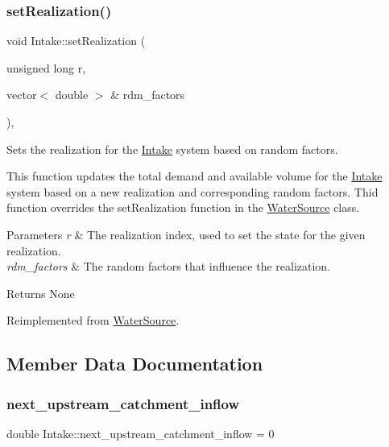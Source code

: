 \subsubsection{\texorpdfstring{set\+Realization()}{setRealization()}}
{\footnotesize\ttfamily void Intake\+::set\+Realization (\begin{DoxyParamCaption}\item[{unsigned long}]{r,  }\item[{vector$<$ double $>$ \&}]{rdm\+\_\+factors }\end{DoxyParamCaption})\hspace{0.3cm}{\ttfamily [override]}, {\ttfamily [virtual]}}



Sets the realization for the \mbox{\hyperlink{classIntake}{Intake}} system based on random factors. 

This function updates the total demand and available volume for the \mbox{\hyperlink{classIntake}{Intake}} system based on a new realization and corresponding random factors. Thid function overrides the set\+Realization function in the \mbox{\hyperlink{classWaterSource}{Water\+Source}} class.


\begin{DoxyParams}{Parameters}
{\em r} & The realization index, used to set the state for the given realization. \\
\hline
{\em rdm\+\_\+factors} & The random factors that influence the realization.\\
\hline
\end{DoxyParams}
\begin{DoxyReturn}{Returns}
None 
\end{DoxyReturn}


Reimplemented from \mbox{\hyperlink{classWaterSource_a634904c510b16de6d7c057fed6d6e625}{Water\+Source}}.



\subsection{Member Data Documentation}
\mbox{\label{classIntake_a5d28f8899e9d4d61983ad8fdf7d58373}} 
\subsubsection{\texorpdfstring{next\+\_\+upstream\+\_\+catchment\+\_\+inflow}{next\_upstream\_catchment\_inflow}}
{\footnotesize\ttfamily double Intake\+::next\+\_\+upstream\+\_\+catchment\+\_\+inflow = 0}



